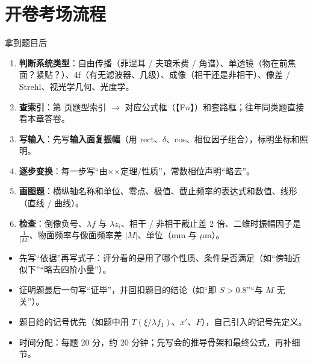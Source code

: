 \section{开卷考场流程}\label{sec:examflow}
\begin{recipe}{拿到题目后}
\begin{enumerate}
\item \textbf{判断系统类型}：自由传播（菲涅耳 / 夫琅禾费 / 角谱）、单透镜（物在前焦面？紧贴？）、4f（有无滤波器、几级）、成像（相干还是非相干）、像差 / Strehl、视光学几何、光度学。
\item \textbf{查索引}：第 \pageref{tab:typeindex} 页题型索引 $\to$ 对应公式框（【F$n$】）和套路框；往年同类题直接看本章答卷。
\item \textbf{写输入}：先写\textbf{输入面复振幅}（用 rect、$\delta$、cos、相位因子组合），标明坐标和照明。
\item \textbf{逐步变换}：每一步写“由××定理/性质”，常数相位声明“略去”。
\item \textbf{画图题}：横纵轴名称和单位、零点、极值、截止频率的表达式和数值、线形（直线 / 曲线）。
\item \textbf{检查}：倒像负号、$\lambda f$ 与 $\lambda z_i$、相干 / 非相干截止差 2 倍、二维时振幅因子是 $\frac1{|M|}$、物面频率与像面频率差 $|M|$、单位（mm 与 $\mu$m）。
\end{enumerate}
\end{recipe}

\begin{warn}[答卷书写要点]
\begin{itemize}
\item 先写“依据”再写式子：评分看的是用了哪个性质、条件是否满足（如“傍轴近似下”“略去四阶小量”）。
\item 证明题最后一句写“证毕”，并回扣题目的结论（如“即 $S>0.8$”“与 $M$ 无关”）。
\item 题目给的记号优先（如题中用 $T(\xi/\lambda f_1)$、$x'$、$F$），自己引入的记号先定义。
\item 时间分配：每题 20 分，约 20 分钟；先写会的推导骨架和最终公式，再补细节。
\end{itemize}
\end{warn}
